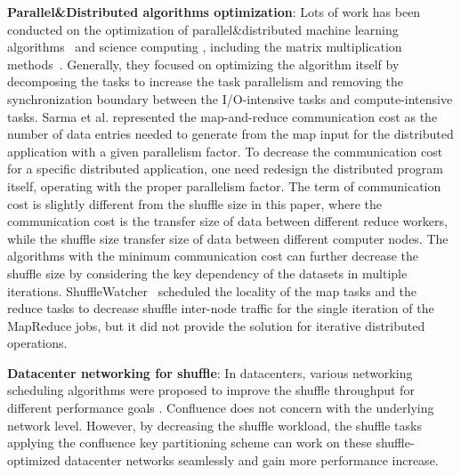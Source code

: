 \documentclass[10pt,journal,compsoc]{IEEEtran}
\begin{document}
\textbf{Parallel\&Distributed algorithms optimization}: Lots of work has been conducted on the optimization of parallel\&distributed machine learning algorithms~\cite{bekkerman2011scaling} and science computing \cite{kiran2013verification, mensink2012metric}, including the matrix multiplication methods~\cite{buluc2012parallel, ballard2012communication}. 
Generally, they focused on optimizing the algorithm itself by decomposing the tasks to increase the task parallelism and removing the synchronization boundary between the I/O-intensive tasks and compute-intensive tasks. 
Sarma et al. \cite{Sarma:2013:ULB} represented the map-and-reduce communication cost as the number of data entries needed to generate from the map input for the distributed application with a given parallelism factor. 
To decrease the communication cost for a specific distributed application, one need redesign the distributed program itself, operating with the proper parallelism factor. 
The term of communication cost is slightly different from the shuffle size in this paper, where the communication cost is the transfer size of data between different reduce workers, while the shuffle size transfer size of data between different computer nodes. 
The algorithms with the minimum communication cost can further decrease the shuffle size by considering the key dependency of the datasets in multiple iterations. 
ShuffleWatcher~\cite{faraz2014shufflewatcher} scheduled the locality of the map tasks and the reduce tasks to decrease shuffle inter-node traffic for the single 
iteration of the MapReduce jobs, but it did not provide the solution for iterative distributed operations. 


\textbf{Datacenter networking for shuffle}: 
In datacenters, various networking scheduling algorithms were proposed to improve the shuffle throughput for different performance goals \cite{greenberg2009vl2,popa2012faircloud,shieh2011sharing,chowdhury2011managing}.  
Confluence does not concern with the underlying network level. However, by decreasing the shuffle workload, the shuffle tasks applying the confluence key partitioning scheme can work on these shuffle-optimized datacenter networks seamlessly and gain more performance increase.    
\end{document}
